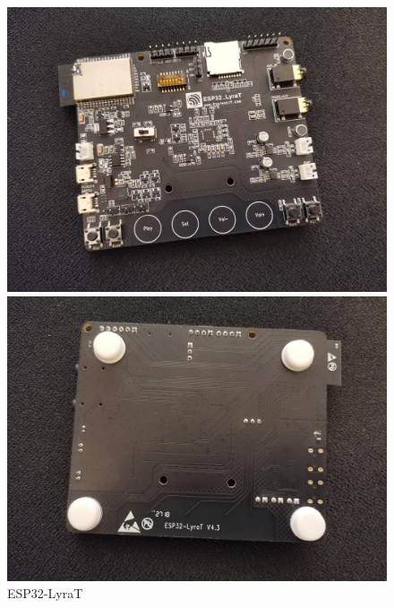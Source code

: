 \documentclass[thesis=M,english]{FITthesis}[2019/12/23]
\begin{document}
\iftrue
\begin{figure}[H]
\centering
\begin{minipage}{.5\textwidth}
  \centering
  \includegraphics[width=1\linewidth]{images/ESP32-LyraT-1.jpg}
\end{minipage}%
\begin{minipage}{.5\textwidth}
  \centering
  \includegraphics[width=1\linewidth]{images/ESP32-LyraT-2.jpg}
\end{minipage}
\caption{ESP32-LyraT}
\label{esp32-lyrat}
\end{figure}
\fi
\end{document}
